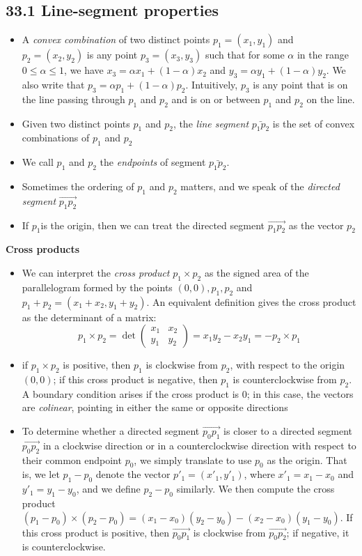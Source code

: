 \documentclass{report}
\begin{document}
\subsection*{33.1 Line-segment properties}
\begin{itemize}
    \item A \textit{convex combination} of two distinct points $p_1 = (x_1, y_1)$ and $p_2 = (x_2, y_2)$ is any point $p_3 = (x_3, y_3)$ such that for some $\alpha$ in the range $0 \leq \alpha \leq 1$, we have $x_3 = \alpha x_1 + (1 - \alpha)x_2$ and $y_3 = \alpha y_1 + (1 - \alpha) y_2$. We also write that $p_3 = \alpha p_1 + (1 - \alpha) p_2$. Intuitively, $p_3$ is any point that is on the line passing through $p_1$ and $p_2$ and is on or between $p_1$ and $p_2$ on the line.
    \item Given two distinct points $p_1$ and $p_2$, the \textit{line segment} $\bar{p_1p_2}$ is the set of convex combinations of $p_1$ and $p_2$
    \item We call $p_1$ and $p_2$ the \textit{endpoints} of segment $\bar{p_1p_2}$.
    \item Sometimes the ordering of $p_1$ and $p_2$ matters, and we speak of the \textit{directed segment} $\overrightarrow{p_1p_2}$
    \item If $p_1$is the origin, then we can treat the directed segment $\overrightarrow{p_1p_2}$ as the vector $p_2$
\end{itemize}
\textbf{Cross products}
\begin{itemize}
    \item We can interpret the \textit{cross product} $p_1 \times p_2$ as the signed area of the parallelogram formed by the points $(0, 0), p_1, p_2$ and $p_1 + p_2 = (x_1 + x_2, y_1 + y_2)$. An equivalent definition gives the cross product as the determinant of a matrix:
    \[
    p_1 \times p_2 =
    \det
    \begin{pmatrix}
       x_1 & x_2 \\
       y_1 & y_2 
    \end{pmatrix}
    =
    x_1 y_2 - x_2 y_1
    = -p_2 \times p_1    
    \]
    \item if $p_1 \times p_2$ is positive, then $p_1$ is clockwise from $p_2$, with respect to the origin $(0, 0)$; if this cross product is negative, then $p_1$ is counterclockwise from $p_2$. A boundary condition arises if the cross product is 0; in this case, the vectors are \textit{colinear}, pointing in either the same or opposite directions
    \item To determine whether a directed segment $\overrightarrow{p_0p_1}$ is closer to a directed segment $\overrightarrow{p_0p_2}$ in a clockwise direction or in a counterclockwise direction with respect to their common endpoint $p_0$, we simply translate to use $p_0$ as the origin. That is, we let $p_1 - p_0$ denote the vector $p'_1 = (x'_1, y'_1)$, where $x'_1 = x_1 - x_0$ and $y'_1 = y_1 - y_0$, and we define $p_2 - p_0$ similarly. We then compute the cross product $(p_1 - p_0) \times (p_2 - p_0) = (x_1 - x_0)(y_2 - y_0) - (x_2 - x_0)(y_1 - y_0)$. If this cross product is positive, then $\overrightarrow{p_0p_1}$ is clockwise from $\overrightarrow{p_0p_2}$; if negative, it is counterclockwise.
\end{itemize}
\end{document}
